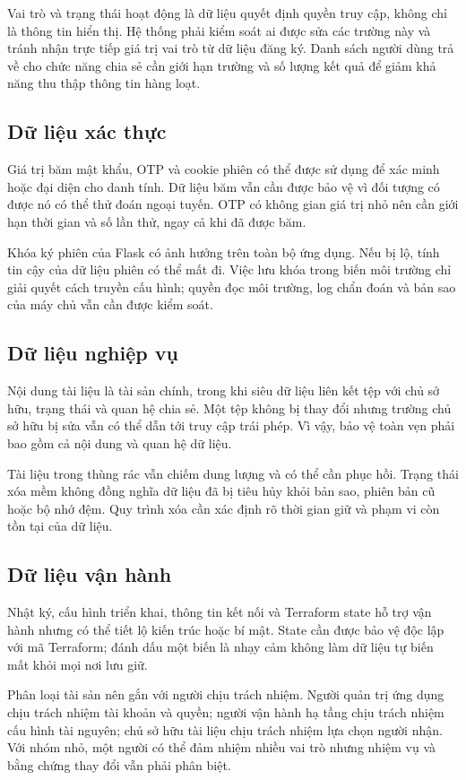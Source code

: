 Vai trò và trạng thái hoạt động là dữ liệu quyết định quyền truy cập, không chỉ là thông tin hiển thị. Hệ thống phải kiểm soát ai được sửa các trường này và tránh nhận trực tiếp giá trị vai trò từ dữ liệu đăng ký. Danh sách người dùng trả về cho chức năng chia sẻ cần giới hạn trường và số lượng kết quả để giảm khả năng thu thập thông tin hàng loạt.
\subsection{Dữ liệu xác thực}
Giá trị băm mật khẩu, OTP và cookie phiên có thể được sử dụng để xác minh hoặc đại diện cho danh tính. Dữ liệu băm vẫn cần được bảo vệ vì đối tượng có được nó có thể thử đoán ngoại tuyến. OTP có không gian giá trị nhỏ nên cần giới hạn thời gian và số lần thử, ngay cả khi đã được băm.

Khóa ký phiên của Flask có ảnh hưởng trên toàn bộ ứng dụng. Nếu bị lộ, tính tin cậy của dữ liệu phiên có thể mất đi. Việc lưu khóa trong biến môi trường chỉ giải quyết cách truyền cấu hình; quyền đọc môi trường, log chẩn đoán và bản sao của máy chủ vẫn cần được kiểm soát.
\subsection{Dữ liệu nghiệp vụ}
Nội dung tài liệu là tài sản chính, trong khi siêu dữ liệu liên kết tệp với chủ sở hữu, trạng thái và quan hệ chia sẻ. Một tệp không bị thay đổi nhưng trường chủ sở hữu bị sửa vẫn có thể dẫn tới truy cập trái phép. Vì vậy, bảo vệ toàn vẹn phải bao gồm cả nội dung và quan hệ dữ liệu.

Tài liệu trong thùng rác vẫn chiếm dung lượng và có thể cần phục hồi. Trạng thái xóa mềm không đồng nghĩa dữ liệu đã bị tiêu hủy khỏi bản sao, phiên bản cũ hoặc bộ nhớ đệm. Quy trình xóa cần xác định rõ thời gian giữ và phạm vi còn tồn tại của dữ liệu.
\subsection{Dữ liệu vận hành}
Nhật ký, cấu hình triển khai, thông tin kết nối và Terraform state hỗ trợ vận hành nhưng có thể tiết lộ kiến trúc hoặc bí mật. State cần được bảo vệ độc lập với mã Terraform; đánh dấu một biến là nhạy cảm không làm dữ liệu tự biến mất khỏi mọi nơi lưu giữ.

Phân loại tài sản nên gắn với người chịu trách nhiệm. Người quản trị ứng dụng chịu trách nhiệm tài khoản và quyền; người vận hành hạ tầng chịu trách nhiệm cấu hình tài nguyên; chủ sở hữu tài liệu chịu trách nhiệm lựa chọn người nhận. Với nhóm nhỏ, một người có thể đảm nhiệm nhiều vai trò nhưng nhiệm vụ và bằng chứng thay đổi vẫn phải phân biệt.

